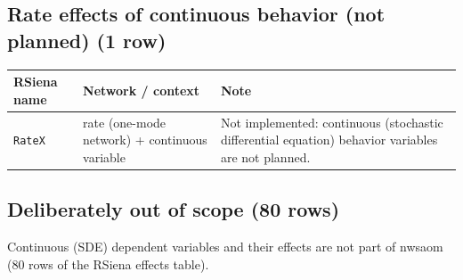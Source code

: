 \subsection*{Rate effects of continuous behavior (not planned) (1 row)}
\footnotesize
\begin{longtable}{@{}p{2.8cm}p{4.6cm}p{6.5cm}@{}}
\toprule
RSiena name & Network / context & Note\\
\midrule
\endhead
\texttt{RateX} & rate (one-mode network) + continuous variable & Not implemented: continuous (stochastic differential equation) behavior variables are not planned.\\
\bottomrule
\end{longtable}
\normalsize

\subsection*{Deliberately out of scope (80 rows)}
\noindent Continuous (SDE) dependent variables and their effects are not part of nwsaom (80 rows of the RSiena effects table).

